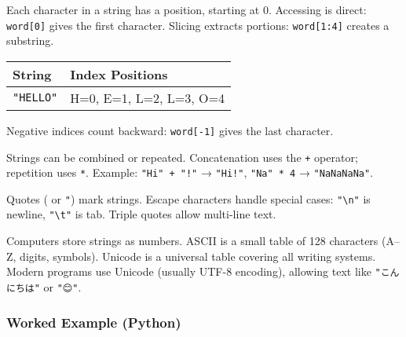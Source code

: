 \documentclass[
  letterpaper,
  DIV=11,
  numbers=noendperiod]{scrreprt}
\begin{document}
Each character in a string has a position, starting at 0. Accessing is
direct: \texttt{word{[}0{]}} gives the first character. Slicing extracts
portions: \texttt{word{[}1:4{]}} creates a substring.

\begin{longtable}[]{@{}ll@{}}
\toprule\noalign{}
String & Index Positions \\
\midrule\noalign{}
\endhead
\bottomrule\noalign{}
\endlastfoot
\texttt{"HELLO"} & H=0, E=1, L=2, L=3, O=4 \\
\end{longtable}

Negative indices count backward: \texttt{word{[}-1{]}} gives the last
character.

Strings can be combined or repeated. Concatenation uses the \texttt{+}
operator; repetition uses \texttt{*}. Example: \texttt{"Hi"\ +\ "!"} →
\texttt{"Hi!"}, \texttt{"Na"\ *\ 4} → \texttt{"NaNaNaNa"}.

Quotes (\texttt{\textquotesingle{}} or \texttt{"}) mark strings. Escape
characters handle special cases: \texttt{"\textbackslash{}n"} is
newline, \texttt{"\textbackslash{}t"} is tab. Triple quotes allow
multi-line text.

Computers store strings as numbers. ASCII is a small table of 128
characters (A--Z, digits, symbols). Unicode is a universal table
covering all writing systems. Modern programs use Unicode (usually UTF-8
encoding), allowing text like \texttt{"こんにちは"} or \texttt{"😊"}.

\subsubsection{Worked Example (Python)}\label{worked-example-python-4}
\end{document}
